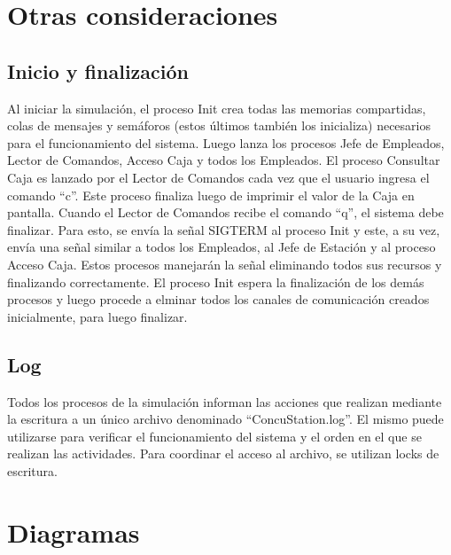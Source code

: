 \documentclass{article}
\begin{document}
\section{Otras consideraciones}
\subsection{Inicio y finalización}
Al iniciar la simulación, el proceso Init crea todas las memorias compartidas, colas de mensajes y semáforos (estos últimos también los inicializa) necesarios para el funcionamiento del sistema. Luego lanza los procesos Jefe de Empleados, Lector de Comandos, Acceso Caja y todos los Empleados. El proceso Consultar Caja es lanzado por el Lector de Comandos cada vez que el usuario ingresa el comando ``c''. Este proceso finaliza luego de imprimir el valor de la Caja en pantalla.
Cuando el Lector de Comandos recibe el comando ``q'', el sistema debe finalizar. Para esto, se envía la señal SIGTERM al proceso Init y este, a su vez, envía una señal similar a todos los Empleados, al Jefe de Estación y al proceso Acceso Caja. Estos procesos manejarán la señal eliminando todos sus recursos y finalizando correctamente. El proceso Init espera la finalización de los demás procesos y luego procede a elminar todos los canales de comunicación creados inicialmente, para luego finalizar.
\subsection{Log}
Todos los procesos de la simulación informan las acciones que realizan mediante la escritura a un único archivo denominado ``ConcuStation.log''. El mismo puede utilizarse para verificar el funcionamiento del sistema y el orden en el que se realizan las actividades. Para coordinar el acceso al archivo, se utilizan locks de escritura.

\section{Diagramas}
\end{document}
